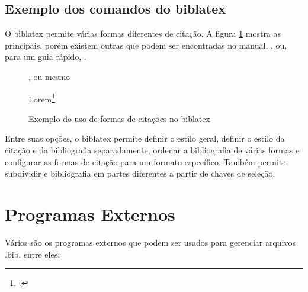 
\subsection{Exemplo dos comandos do biblatex}

O biblatex permite várias formas diferentes de citação. A figura \ref{fig:cite} mostra as principais, porém existem outras que podem ser encontradas no manual, \parencite{Kime:2019}, ou, para um guia rápido, \autocite{Rees:2017}.

\begin{figure}[hbt]
\centering
\begin{LTXexample}[pos=b]

\autocite{biber:2012}

\cite{biber:2012}

\parencite{biber:2012}, ou mesmo
 \parencite[veja][12]{biber:2012}

\textcite{biber:2012}

Lorem\footcite{biber:2012}

\end{LTXexample}
\caption{Exemplo do uso de formas de citações no biblatex}
\label{fig:cite}
\end{figure}

Entre suas opções, o biblatex permite definir o estilo geral, definir o estilo da citação e da bibliografia separadamente, ordenar a bibliografia de várias formas e configurar as formas de citação para um formato específico. Também permite subdividir e bibliografia em partes diferentes a partir de chaves de seleção\parencite{Cassidy:2013,Kime:2019}.

\section{Programas Externos}

Vários são os programas externos que podem ser usados
para gerenciar arquivos .bib, entre eles:

